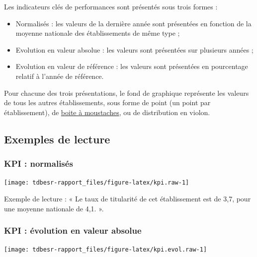 \documentclass[12pt,french,landscape]{article}
\providecommand{\tightlist}{%
  \setlength{\itemsep}{0pt}\setlength{\parskip}{0pt}}
\begin{document}
\begin{multicols}{2}
Les indicateurs clés de performances sont présentés sous trois formes :

\begin{itemize}
\tightlist
\item
  Normalisés : les valeurs de la dernière année sont présentées en
  fonction de la moyenne nationale des établissements de même type ;
\item
  Evolution en valeur absolue : les valeurs sont présentées sur
  plusieurs années ;
\item
  Evolution en valeur de référence : les valeurs sont présentées en
  pourcentage relatif à l'année de référence.
\end{itemize}

Pour chacune des trois présentations, le fond de graphique représente
les valeurs de tous les autres établissements, sous forme de point (un
point par établissement), de
\href{https://fr.wikipedia.org/wiki/Bo\%C3\%AEte_\%C3\%A0_moustaches}{boite
à moustaches}, ou de distribution en violon.

\hypertarget{exemples-de-lecture}{%
\subsection{Exemples de lecture}\label{exemples-de-lecture}}

\hypertarget{kpi-normalisuxe9s}{%
\subsubsection{KPI : normalisés}\label{kpi-normalisuxe9s}}

\begin{center}\texttt{[image: tdbesr-rapport\_files/figure-latex/kpi.raw-1]} \end{center}

Exemple de lecture : « Le taux de titularité de cet établissement est de
3,7, pour une moyenne nationale de 4,1. ».

\hypertarget{kpi-uxe9volution-en-valeur-absolue}{%
\subsubsection{KPI : évolution en valeur
absolue}\label{kpi-uxe9volution-en-valeur-absolue}}

\begin{center}\texttt{[image: tdbesr-rapport\_files/figure-latex/kpi.evol.raw-1]} \end{center}


\end{multicols}
\end{document}
